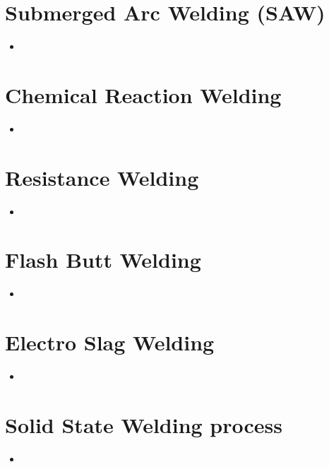 \documentclass[8pt]{report}
\begin{document}
\section{Submerged Arc Welding (SAW)}
	\begin{itemize}
		\item
	\end{itemize}\hrulefill
\section{Chemical Reaction Welding}
	\begin{itemize}
		\item
	\end{itemize}\hrulefill
\section{Resistance Welding}
	\begin{itemize}
		\item
	\end{itemize}\hrulefill
\section{Flash Butt Welding}
	\begin{itemize}
		\item
	\end{itemize}\hrulefill
\section{Electro Slag Welding}
	\begin{itemize}
		\item
	\end{itemize}\hrulefill
\section{Solid State Welding process}
	\begin{itemize}
		\item
	\end{itemize}\hrulefill
\end{document}

